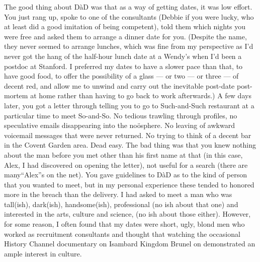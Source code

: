 The good thing about DàD was that as a
way of getting dates, it was low effort. You just rang up, spoke to
one of the consultants (Debbie if you were lucky, who at least did a
good imitation of being competent), told them which nights you were
free and asked them to arrange a dinner date for you. (Despite the
name, they never seemed to arrange lunches, which was fine from my
perspective as I'd never got the hang of the half-hour lunch date at a Wendy's when I'd been a postdoc at
Stanford. I preferred my dates to have a slower pace than that, to
have good food, to offer the possibility of a glass --- or two
--- or three --- of decent red, and allow me to unwind and carry out
the inevitable post-date post-mortem at home rather than having to
go back to work afterwards.) A few days later, you got a letter
through telling you to go to Such-and-Such restaurant at a
particular time to meet So-and-So. No tedious trawling through
profiles, no speculative emails disappearing into the noösphere.
No leaving of awkward voicemail messages that were never returned. No
trying to think of a decent bar in the Covent Garden area. Dead
easy. The bad thing was that you knew nothing about the man before
you met other than his first name at that (in this case,
Alex, I had discovered on opening the letter), not useful
for a search (there are many``Alex''s on the net). You
gave guidelines to DàD as to the kind of person that
you wanted to meet, but in my personal experience these
tended to honored more in the breach than the delivery. I had asked
to meet a man who was tall(ish), dark(ish), handsome(ish),
professional (no ish about that one) and interested in the arts,
culture and science, ({\twelveit no\/} ish about those either).
However, for some reason, I often found that my dates were short,
ugly, blond men who worked as recruitment consultants and thought
that watching the occasional History Channel documentary on Isambard Kingdom
Brunel on demonstrated an ample interest in culture.


